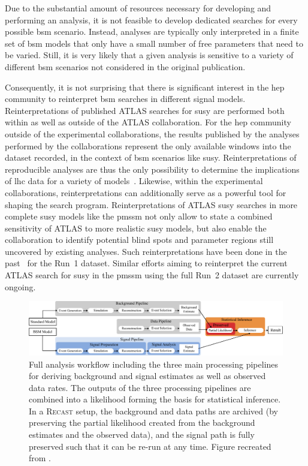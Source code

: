 Due to the substantial amount of resources necessary for developing and performing an analysis, it is not feasible to develop dedicated searches for every possible \gls{bsm} scenario. Instead, analyses are typically only interpreted in a finite set of \gls{bsm} models that only have a small number of free parameters that need to be varied. Still, it is very likely that a given analysis is sensitive to a variety of different \gls{bsm} scenarios not considered in the original publication. 

Consequently, it is not surprising that there is significant interest in the \gls{hep} community to reinterpret \gls{bsm} searches in different signal models. Reinterpretations of published ATLAS searches for \gls{susy} are performed both within as well as outside of the ATLAS collaboration. For the \gls{hep} community outside of the experimental collaborations, the results published by the analyses performed by the collaborations represent the only available windows into the dataset recorded, in the context of \gls{bsm} scenarios like \gls{susy}. Reinterpretations of reproducible analyses are thus the only possibility to determine the implications of \gls{lhc} data for a variety of models~\cite{reinterpretation_workshop}. Likewise, within the experimental collaborations, reinterpretations can additionally serve as a powerful tool for shaping the search program. Reinterpretations of ATLAS \gls{susy} searches in more complete \gls{susy} models like the \gls{pmssm} not only allow to state a combined sensitivity of ATLAS to more realistic \gls{susy} models, but also enable the collaboration to identify potential blind spots and parameter regions still uncovered by existing analyses. Such reinterpretations have been done in the past~\cite{pMSSM-scan-run1:2015baa,Ambrogi:2017lov} for the Run~1 dataset. Similar efforts aiming to reinterpret the current ATLAS search for \gls{susy} in the \gls{pmssm} using the full Run~2 dataset are currently ongoing. 

 \begin{figure}
	\centering\includegraphics[width=\textwidth]{pipeline}
	\caption{Full analysis workflow including the three main processing pipelines for deriving background and signal estimates as well as observed data rates. The outputs of the three processing pipelines are combined into a likelihood forming the basis for statistical inference. In a \textsc{Recast} setup, the background and data paths are archived (\eg by preserving the partial likelihood created from the background estimates and the observed data), and the signal path is fully preserved such that it can be re-run at any time. Figure recreated from \cite{ATL-PHYS-PUB-2019-032}.}
	\label{fig:pipeline_analysis}
\end{figure}


